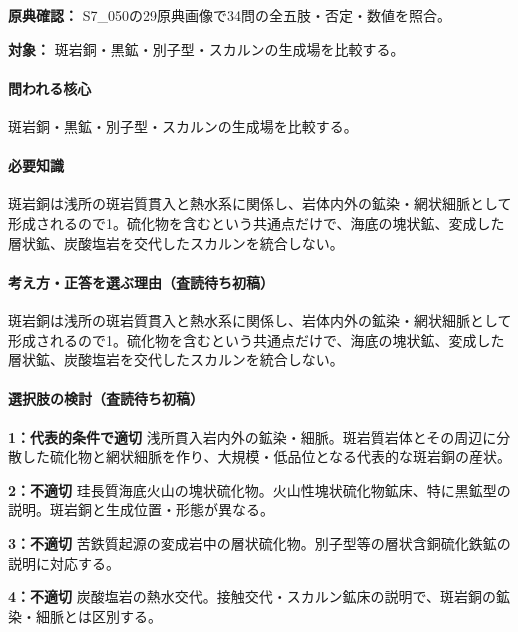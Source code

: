 \noindent\textbf{原典確認：} S7\_050の29原典画像で34問の全五肢・否定・数値を照合。\par

\noindent\textbf{対象：} 斑岩銅・黒鉱・別子型・スカルンの生成場を比較する。\par

\paragraph{問われる核心} 斑岩銅・黒鉱・別子型・スカルンの生成場を比較する。

\paragraph{必要知識} 斑岩銅は浅所の斑岩質貫入と熱水系に関係し、岩体内外の鉱染・網状細脈として形成されるので1。硫化物を含むという共通点だけで、海底の塊状鉱、変成した層状鉱、炭酸塩岩を交代したスカルンを統合しない。

\paragraph{考え方・正答を選ぶ理由（査読待ち初稿）} 斑岩銅は浅所の斑岩質貫入と熱水系に関係し、岩体内外の鉱染・網状細脈として形成されるので1。硫化物を含むという共通点だけで、海底の塊状鉱、変成した層状鉱、炭酸塩岩を交代したスカルンを統合しない。

\paragraph{選択肢の検討（査読待ち初稿）}\mbox{}\par

\noindent\textbf{1：代表的条件で適切} 浅所貫入岩内外の鉱染・細脈。斑岩質岩体とその周辺に分散した硫化物と網状細脈を作り、大規模・低品位となる代表的な斑岩銅の産状。\par

\noindent\textbf{2：不適切} 珪長質海底火山の塊状硫化物。火山性塊状硫化物鉱床、特に黒鉱型の説明。斑岩銅と生成位置・形態が異なる。\par

\noindent\textbf{3：不適切} 苦鉄質起源の変成岩中の層状硫化物。別子型等の層状含銅硫化鉄鉱の説明に対応する。\par

\noindent\textbf{4：不適切} 炭酸塩岩の熱水交代。接触交代・スカルン鉱床の説明で、斑岩銅の鉱染・細脈とは区別する。\par

